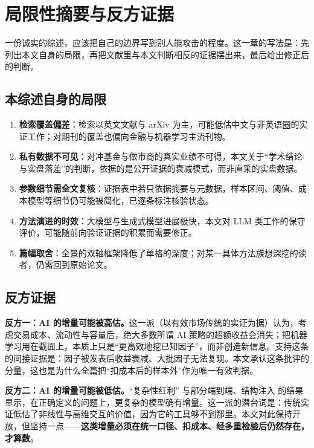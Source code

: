 \section{局限性摘要与反方证据}\label{sec:limitations}

一份诚实的综述，应该把自己的边界写到别人能攻击的程度。这一章的写法是：先列出本文自身的局限，再把文献里与本文判断相反的证据摆出来，最后给出修正后的判断。

\subsection{本综述自身的局限}

\begin{enumerate}
  \item \textbf{检索覆盖偏差}：检索以英文文献与 arXiv 为主，可能低估中文与非英语圈的实证工作；对期刊的覆盖也偏向金融与机器学习主流刊物。
  \item \textbf{私有数据不可见}：对冲基金与做市商的真实业绩不可得，本文关于“学术结论与实盘落差”的判断，依据的是公开证据的衰减模式，而非直采的实盘数据。
  \item \textbf{参数细节需全文复核}：证据表中若只依据摘要与元数据，样本区间、阈值、成本模型等细节仍可能被简化，已逐条标注核验状态。
  \item \textbf{方法演进的时效}：大模型与生成式模型进展极快，本文对 LLM 类工作的保守评价，可能随前向验证证据的积累而需要修正。
  \item \textbf{篇幅取舍}：全景的双轴框架降低了单格的深度；对某一具体方法族想深挖的读者，仍需回到原始论文。
\end{enumerate}

\subsection{反方证据}

\textbf{反方一：AI 的增量可能被高估。}这一派（以有效市场传统的实证为据）认为，考虑交易成本、流动性与容量后，绝大多数所谓 AI 策略的超额收益会消失；把机器学习用在截面上，本质上只是“更高效地挖已知因子”，而非创造新信息。支持这条的间接证据是：因子被发表后收益衰减\cite{mcleanpontiff2016}、大批因子无法复现\cite{jensen2023}。本文承认这条批评的分量，这也是为什么全篇把“扣成本后的样本外”作为唯一有效判据。

\textbf{反方二：AI 的增量可能被低估。}“复杂性红利”\cite{kellymalamudzhou2024} 与部分端到端\cite{costa2022}、结构注入\cite{chenpelgerzhu2024} 的结果显示，在正确定义的问题上，更复杂的模型确有增量。这一派的潜台词是：传统实证低估了非线性与高维交互的价值，因为它的工具够不到那里。本文对此保持开放，但坚持一点——\textbf{这类增量必须在统一口径、扣成本、经多重检验后仍然存在，才算数}。

